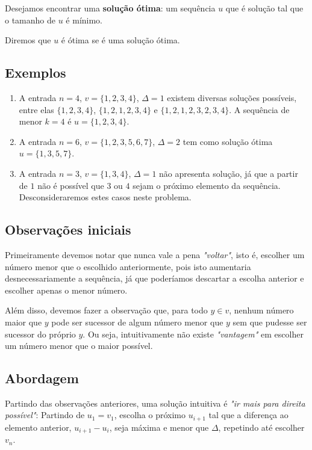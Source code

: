 Desejamos encontrar uma \textbf{solução ótima}: um sequência $u$ que é solução tal que o tamanho de $u$ é mínimo.

Diremos que $u$ é ótima se é uma solução ótima.

\subsection*{Exemplos}

\begin{enumerate}
    \item A entrada $n = 4$, $v = \{1, 2, 3, 4\}$, $\Delta = 1$ existem diversas soluções possíveis, entre elas $\{1, 2, 3, 4\}$, $\{1, 2, 1, 2, 3, 4\}$ e $\{1, 2, 1, 2, 3, 2, 3, 4\}$. A sequência de menor $k = 4$ é $u = \{1, 2, 3, 4\}$.
    \item A entrada $n = 6$, $v = \{1, 2, 3, 5, 6, 7\}$, $\Delta = 2$ tem como solução ótima $u = \{1, 3, 5, 7\}$.
    \item A entrada $n = 3$, $v = \{1, 3, 4\}$, $\Delta = 1$ não apresenta solução, já que a partir de $1$ não é possível que $3$ ou $4$ sejam o próximo elemento da sequência. Desconsideraremos estes casos neste problema.
\end{enumerate}

\subsection*{Observações iniciais}

Primeiramente devemos notar que nunca vale a pena \textit{"voltar"}, isto é, escolher um número menor que o escolhido anteriormente, pois isto aumentaria desnecessariamente a sequência, já que poderíamos descartar a escolha anterior e escolher apenas o menor número.

Além disso, devemos fazer a observação que, para todo $y \in v$, nenhum número maior que $y$ pode ser sucessor de algum número menor que $y$ sem que pudesse ser sucessor do próprio $y$. Ou seja, intuitivamente não existe \textit{"vantagem"} em escolher um número menor que o maior possível.

\subsection*{Abordagem}
\label{salto:abor}

Partindo das observações anteriores, uma solução intuitiva é \textit{"ir mais para direita possível"}: Partindo de $u_1 = v_1$, escolha o próximo $u_{i + 1}$ tal que a diferença ao elemento anterior, $u_{i + 1} - u_i$, seja máxima e menor que $\Delta$, repetindo até escolher $v_n$.

